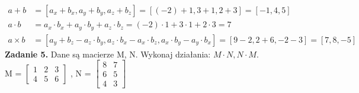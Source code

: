 \documentclass[a4paper]{article}
\begin{document}
\begin{align*}
a + b &= \left[a_x+b_x,a_y+b_y,a_z+b_z\right]=\left[ (-2) + 1, 3+1,2+3\right] = \left[-1,4,5\right]\\
a\cdot b &= a_x\cdot b_x + a_y \cdot b_y + a_z\cdot b_z = (-2) \cdot 1 + 3\cdot 1 + 2\cdot 3 = 7\\
a \times b &= \left[a_y+b_z - a_z\cdot b_y , a_z \cdot b_x - a_x \cdot b_z , a_x \cdot b_y - a_y \cdot b_x \right] = \left[ 9 - 2, 2 + 6, -2 -3\right] = \left[7,8,-5\right]
\end{align*}
\noindent\textbf{Zadanie 5.}
\textnormal{Dane są macierze M, N. Wykonaj działania: $M \cdot N , N \cdot M$.}\\
M = 
$\left[
\begin{matrix}
1 & 2 & 3\\
4 & 5 & 6
\end{matrix}
\right]$ , 
N = 
$\left[
\begin{matrix}
8 & 7 \\
6 & 5 \\
4 & 3
\end{matrix}
\right]$
\end{document}
